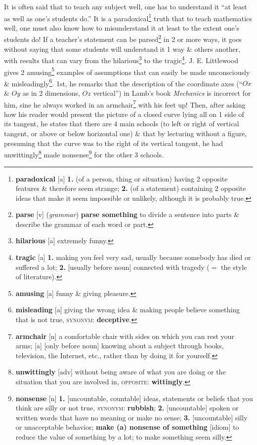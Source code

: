 \documentclass[oneside]{book}
\numberwithin{equation}{section}
\begin{document}
It is often said that to teach any subject well, one has to understand it ``at least as well as one's students do.'' It is a paradoxical\footnote{\textbf{paradoxical} [a] \textbf{1.} (of a person, thing or situation) having 2 opposite features \& therefore seem strange; \textbf{2.} (of a statement) containing 2 opposite ideas that make it seem impossible or unlikely, although it is probably true.} truth that to teach mathematics well, one must also know how to misunderstand it at least to the extent one's students do! If a teacher's statement can be parsed\footnote{\textbf{parse} [v] (\textit{grammar}) \textbf{parse something} to divide a sentence into parts \& describe the grammar of each word or part.} in 2 or more ways, it goes without saying that some students will understand it 1 way \& others another, with results that can vary from the hilarious\footnote{\textbf{hilarious} [a] extremely funny.} to the tragic\footnote{\textbf{tragic} [a] \textbf{1.} making you feel very sad, usually because somebody has died or suffered a lot; \textbf{2.} [usually before noun] connected with tragedy ($=$ the style of literature).}. J. E. Littlewood gives 2 amusing\footnote{\textbf{amusing} [a] funny \& giving pleasure.} examples of assumptions that can easily be made unconsciously \& misleadingly\footnote{\textbf{misleading} [a] giving the wrong idea \& making people believe something that is not true, \textsc{synonym}: \textbf{deceptive}.}. 1st, he remarks that the description of the coordinate axes (``$Ox$ \& $Oy$ as in 2 dimensions, $Oz$ vertical'') in Lamb's book \textit{Mechanics} is incorrect for him, sine he always worked in an armchair\footnote{\textbf{armchair} [n] a comfortable chair with sides on which you can rest your arms; [a] [only before noun] knowing about a subject through books, television, the Internet, etc., rather than by doing it for yourself.} with his feet up! Then, after asking how his reader would present the picture of a closed curve lying all on 1 side of its tangent, he states that there are 4 main schools (to left or right of vertical tangent, or above or below horizontal one) \& that by lecturing without a figure, presuming that the curve was to the right of its vertical tangent, he had unwittingly\footnote{\textbf{unwittingly} [adv] without being aware of what you are doing or the situation that you are involved in, \textsc{opposite}: \textbf{wittingly}.} made nonsense\footnote{\textbf{nonsense} [n] \textbf{1.} [uncountable, countable] ideas, statements or beliefs that you think are silly or not true, \textsc{synonym}: \textbf{rubbish}; \textbf{2.} [uncountable] spoken or written words that have no meaning or make no sense; \textbf{3.} [uncountable] silly or unacceptable behavior; \textbf{make (a) nonsense of something} [idiom] to reduce the value of something by a lot; to make something seem silly.} for the other 3 schools.
\end{document}
